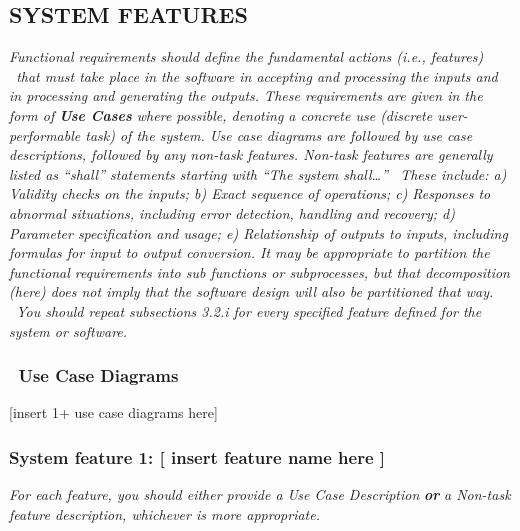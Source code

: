 \documentclass[twoside,letterpaper]{article}
\begin{document}
\subsection[SYSTEM
FEATURES]{\rmfamily\bfseries\color{black}
SYSTEM FEATURES}
{\itshape\color{black}
Functional requirements should define the fundamental actions (i.e.,
features) \ that must take place in the software in accepting and
processing the inputs and in processing and generating the outputs.
These requirements are given in the form of \textbf{Use Cases} where
possible, denoting a concrete use (discrete user-performable task) of
the system. Use case diagrams are followed by use case descriptions,
followed by any non-task features. Non-task features are generally
listed as {\textquotedblleft}shall{\textquotedblright} statements
starting with {\textquotedblleft}The system
shall{\dots}{\textquotedblright} \ These include: a) Validity checks on
the inputs; b) Exact sequence of operations; c) Responses to abnormal
situations, including error detection, handling and recovery; d)
Parameter specification and usage; e) Relationship of outputs to
inputs, including formulas for input to output conversion. \newline
\newline
It may be appropriate to partition the functional requirements into sub
functions or subprocesses, but that decomposition (here) does not imply
that the software design will also be partitioned that way. \ You
should repeat subsections 3.2.i for every specified feature defined for
the system or software.}

\subsubsection[\ Use Case
Diagrams]{\foreignlanguage{english}{\ }\foreignlanguage{english}{Use
Case Diagrams}}
{\color{black}
[insert 1+ use case diagrams here]}

\subsubsection[System feature 1: [ insert feature name here
{]}]{\rmfamily\bfseries\color{black} System
feature 1: [ insert feature name here ]}

\bigskip

{\color{black}
\foreignlanguage{english}{\textit{For each feature, you should either
provide a Use Case Description
}}\foreignlanguage{english}{\textbf{\textit{or}}}\foreignlanguage{english}{\textit{
a Non-task feature description, whichever is more appropriate.}}}
\end{document}
